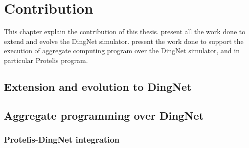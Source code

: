 \chapter{Contribution}
\label{chap:contribution}
This chapter explain the contribution of this thesis.  present all the work done to extend and evolve the DingNet simulator.  present the work done to support the execution of aggregate computing program over the DingNet simulator, and in particular Protelis program. 

\section{Extension and evolution to DingNet}
\label{sec:contributionDingNet}

\section{Aggregate programming over DingNet}
\label{sec:contributionACOverDingNet}

\subsection{Protelis-DingNet integration}


